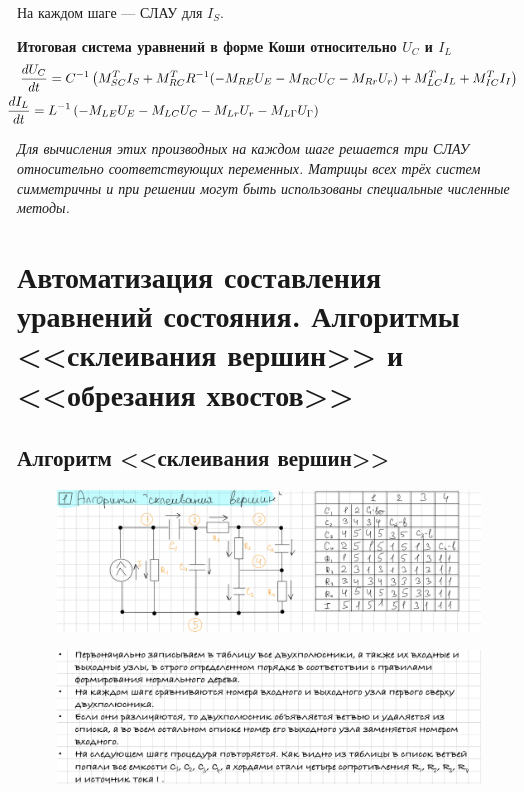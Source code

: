 	На каждом шаге — СЛАУ для $I_S$.
	
	\textbf{Итоговая система уравнений в форме Коши относительно $U_C$ и $I_L$}
	\vspace{-0.5em}
	\begin{equation}
		\begin{aligned}
			&\frac{dU_C}{dt} = C^{-1}\left(M_{SC}^T I_S + M_{RC}^T R^{-1} (-M_{RE} U_E - M_{RC} U_C - M_{Rr} U_r) + M_{LC}^T I_L + M_{IC}^T I_I\right) \nonumber\\
			&\hspace{-1em}\frac{dI_L}{dt} = L^{-1}\left(-M_{LE} U_E - M_{LC} U_C - M_{Lr} U_r - M_{L\Gamma} U_{\Gamma}\right)
		\end{aligned}
	\end{equation}
	
	\vspace{1em}
	\noindent\textit{Для вычисления этих производных на каждом шаге решается три СЛАУ относительно соответствующих переменных. Матрицы всех трёх систем симметричны и при решении могут быть использованы специальные численные методы.}
	
	\newpage
	
	\section{Автоматизация составления уравнений состояния. Алгоритмы <<склеивания вершин>> и <<обрезания хвостов>>}
	
	\subsection{Алгоритм <<склеивания вершин>>}
	
	\begin{figure}[H]
		\centering
		\includegraphics[width=1\linewidth, height=0.2\textheight]{img/25_01}
		\label{fig:25_01}
	\end{figure}
	
	\begin{figure}[H]
		\centering
		\includegraphics[width=1\linewidth, height=0.2\textheight]{img/25_02}
		\label{fig:25_02}
	\end{figure}
	
